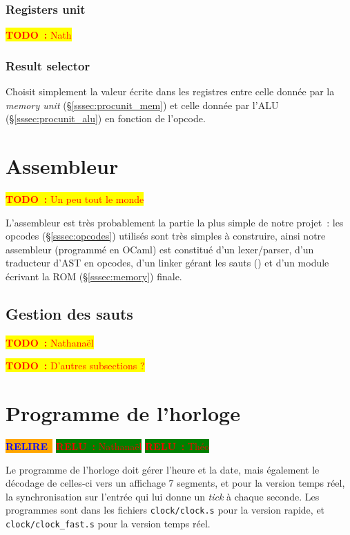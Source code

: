 \documentclass[11pt,a4paper]{article}
\newcommand{\htodo}[1]{\begin{huge}\colorbox{yellow}{\textcolor{red}{\textbf{TODO~:} #1}}\end{huge}}
\newcommand{\todo}[1]{\colorbox{yellow}{\textcolor{red}{\textbf{TODO~:} #1}}}
\newcommand{\relire}{\colorbox{orange}{\textcolor{blue}{\textbf{RELIRE}~}}}
\newcommand{\relu}[1]{\colorbox{green}{\textcolor{red}{\textbf{RELU~:} #1}}}
\begin{document}
\subsubsection{Registers unit}
\todo{Nath}

\subsubsection{Result selector}
Choisit simplement la valeur écrite dans les registres entre celle donnée par la \textit{memory unit} (§\ref{sssec:procunit_mem}) et celle donnée par l'ALU (§\ref{sssec:procunit_alu}) en fonction de l'opcode.

\section{Assembleur} \label{sec:cas}

\htodo{Un peu tout le monde}

L'assembleur est très probablement la partie la plus simple de notre projet~: les opcodes (§\ref{sssec:opcodes}) utilisés sont très simples à construire, ainsi notre assembleur (programmé en OCaml) est constitué d'un lexer/parser, d'un traducteur d'AST en opcodes, d'un \og linker \fg{} gérant les sauts () et d'un module écrivant la ROM (§\ref{sssec:memory}) finale.

\subsection{Gestion des sauts}
\todo{Nathanaël}

\vspace{1em}\htodo{D'autres subsections ?}


\section{Programme de l'horloge} \label{sec:clock}

\relire
\relu{Nathanaël} \relu{Théo}

Le programme de l'horloge doit gérer l'heure et la date, mais
également le décodage de celles-ci vers un affichage 7 segments, et
pour la version temps réel, la synchronisation sur l'entrée qui lui
donne un \textit{tick} à chaque seconde. Les programmes sont dans les
fichiers \verb!clock/clock.s! pour la version rapide, et
\verb!clock/clock_fast.s! pour la version temps réel.
\end{document}
